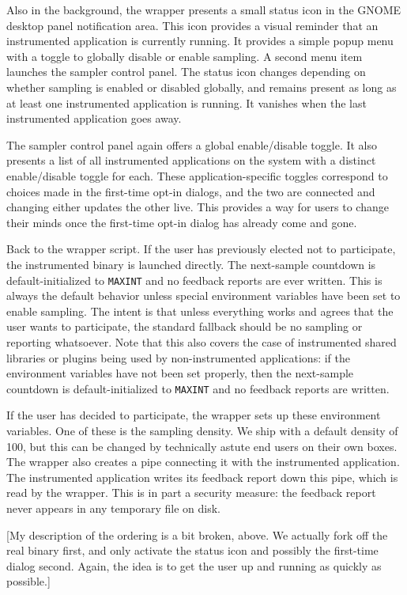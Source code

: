 \documentclass[times,10pt,twocolumn]{article}
\begin{document}
Also in the background, the wrapper presents a small status icon in
the GNOME desktop panel notification area.  This icon provides a
visual reminder that an instrumented application is currently running.
It provides a simple popup menu with a toggle to globally disable or
enable sampling.  A second menu item launches the sampler control
panel.  The status icon changes depending on whether sampling is
enabled or disabled globally, and remains present as long as at least
one instrumented application is running.  It vanishes when the last
instrumented application goes away.

The sampler control panel again offers a global enable/disable toggle.
It also presents a list of all instrumented applications on the system
with a distinct enable/disable toggle for each.  These
application-specific toggles correspond to choices made in the
first-time opt-in dialogs, and the two are connected and changing
either updates the other live.  This provides a way for users to
change their minds once the first-time opt-in dialog has already come
and gone.

Back to the wrapper script.  If the user has previously elected not to
participate, the instrumented binary is launched directly.  The
next-sample countdown is default-initialized to \texttt{MAXINT} and no
feedback reports are ever written.  This is always the default
behavior unless special environment variables have been set to enable
sampling.  The intent is that unless everything works and agrees that
the user wants to participate, the standard fallback should be no
sampling or reporting whatsoever.  Note that this also covers the case
of instrumented shared libraries or plugins being used by
non-instrumented applications: if the environment variables have not
been set properly, then the next-sample countdown is
default-initialized to \texttt{MAXINT} and no feedback reports are
written.

If the user has decided to participate, the wrapper sets up these
environment variables.  One of these is the sampling density.  We ship
with a default density of 100, but this can be changed by technically
astute end users on their own boxes.  The wrapper also creates a pipe
connecting it with the instrumented application.  The instrumented
application writes its feedback report down this pipe, which is read
by the wrapper.  This is in part a security measure: the feedback
report never appears in any temporary file on disk.

[My description of the ordering is a bit broken, above.  We actually
fork off the real binary first, and only activate the status icon and
possibly the first-time dialog second.  Again, the idea is to get the
user up and running as quickly as possible.]
\end{document}
